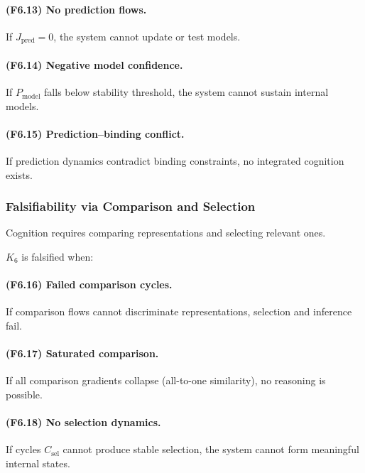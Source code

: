 \paragraph{(F6.13) No prediction flows.}
If $J_{\mathrm{pred}}=0$, the system cannot update or test models.

\paragraph{(F6.14) Negative model confidence.}
If $P_{\mathrm{model}}$ falls below stability threshold,
the system cannot sustain internal models.

\paragraph{(F6.15) Prediction–binding conflict.}
If prediction dynamics contradict binding constraints,
no integrated cognition exists.



\subsubsection{Falsifiability via Comparison and Selection}

Cognition requires comparing representations and selecting relevant ones.

$K_6$ is falsified when:

\paragraph{(F6.16) Failed comparison cycles.}
If comparison flows cannot discriminate representations,
selection and inference fail.

\paragraph{(F6.17) Saturated comparison.}
If all comparison gradients collapse (all-to-one similarity),
no reasoning is possible.

\paragraph{(F6.18) No selection dynamics.}
If cycles $C_{\mathrm{sel}}$ cannot produce stable selection,
the system cannot form meaningful internal states.

